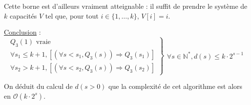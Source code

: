 \documentclass[12pt,a4paper]{article}
\begin{document}
\begin{appendices}
\begin{tcolorbox}
Cette borne est d'ailleurs vraiment atteignable : il suffit de prendre le syst\`eme de $k$ capacit\'es $V$ tel que, pour tout $i \in \{1, \dotsc, k\}$, $V[i] = i$. 
\end{tcolorbox}

\medskip
\underline{Conclusion} : 
\begin{equation*}
\left .\begin{array}{l}
Q_{3}(1) \text{ vraie } \\
\forall s_1 \leq k+1, [(\forall s < s_1, Q_{3}(s)) \Rightarrow Q_{3}(s_1)] \\
\forall s_2 > k+1, [(\forall s < s_2, Q_{3}(s)) \Rightarrow Q_{3}(s_2)]
\end{array} \right \}
\left .\begin{array}{l}
\forall s \in \mathbb{N}^*, d(s) \leq k \cdot 2^{s-1}
\end{array}\right .
\end{equation*}

\bigskip
On d\'eduit du calcul de $d(s > 0)$ que la complexit\'e de cet algorithme est alors en $\mathcal{O}(k\cdot 2^s)$.

\end{appendices}
	
\printindex
\end{document}
